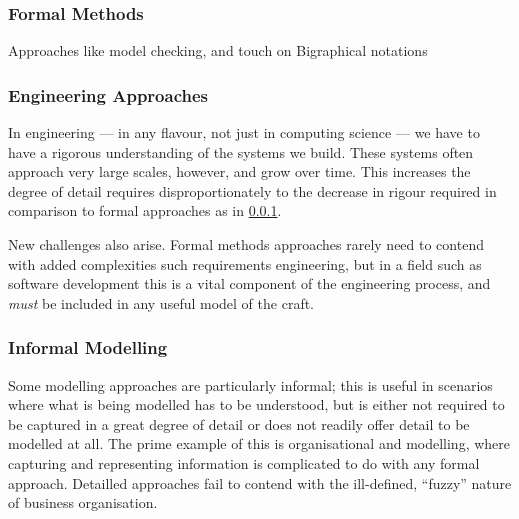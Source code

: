 \documentclass[draft,12pt]{article}
\begin{document}
\subsubsection{Formal Methods}\label{sec:review-formal-methods}

Approaches like model checking, and touch on Bigraphical notations
\par

\subsubsection{Engineering Approaches}

In engineering --- in any flavour, not just in computing science --- we have to have a rigorous understanding of the systems we build. 
These systems often approach very large scales, however, and grow over time.
This increases the degree of detail requires disproportionately to the decrease in rigour required in comparison to formal approaches as in \ref{sec:review-formal-methods}.
\par

New challenges also arise. Formal methods approaches rarely need to contend with added complexities such requirements engineering, but in a field such as software development this is a vital component of the engineering process, and \emph{must} be included in any useful model of the craft.
\par


\subsubsection{Informal Modelling}
Some modelling approaches are particularly informal; this is useful in scenarios where what is being modelled has to be understood, but is either not required to be captured in a great degree of detail or does not readily offer detail to be modelled at all.
The prime example of this is organisational and modelling, where capturing and representing information is complicated to do with any formal approach.
Detailled approaches fail to contend with the ill-defined, ``fuzzy'' nature of business organisation.
\par
\end{document}
